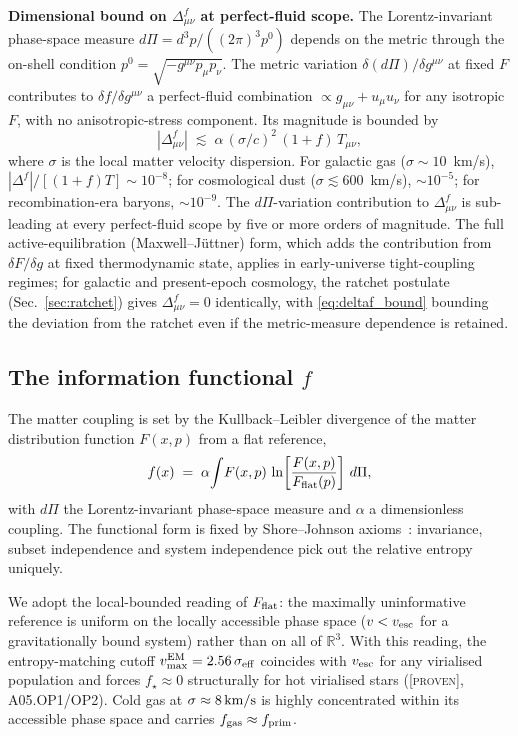 \documentclass[aps,prd,twocolumn,nofootinbib,floatfix,superscriptaddress]{revtex4-2}
\newcommand{\PROVEN}{{\color{black!75!green}\textsc{[proven]}}}
\newcommand{\fprim}{f_{\rm prim}}
\begin{document}
\textbf{Dimensional bound on $\Delta^f_{\mu\nu}$ at perfect-fluid scope.}
The Lorentz-invariant phase-space measure
$d\Pi = d^3p/((2\pi)^3 p^0)$ depends on the metric through the
on-shell condition $p^0 = \sqrt{-g^{\mu\nu}p_\mu p_\nu}$. The metric
variation $\delta(d\Pi)/\delta g^{\mu\nu}$ at fixed $F$ contributes
to $\delta f/\delta g^{\mu\nu}$ a perfect-fluid combination
$\propto g_{\mu\nu} + u_\mu u_\nu$ for any isotropic $F$, with no
anisotropic-stress component. Its magnitude is bounded by
\begin{equation}
\label{eq:deltaf_bound}
|\Delta^f_{\mu\nu}|\;\lesssim\;\alpha\,(\sigma/c)^2\,(1{+}f)\,T_{\mu\nu},
\end{equation}
where $\sigma$ is the local matter velocity dispersion. For galactic
gas ($\sigma\sim 10$~km/s), $|\Delta^f|/[(1{+}f)T]\sim 10^{-8}$; for
cosmological dust ($\sigma\lesssim 600$~km/s), $\sim 10^{-5}$; for
recombination-era baryons, $\sim 10^{-9}$. The $d\Pi$-variation
contribution to $\Delta^f_{\mu\nu}$ is sub-leading at every
perfect-fluid scope by five or more orders of magnitude. The full
active-equilibration (Maxwell--J\"uttner) form, which adds the
contribution from $\delta F/\delta g$ at fixed thermodynamic state,
applies in early-universe tight-coupling regimes; for galactic and
present-epoch cosmology, the ratchet postulate
(Sec.~\ref{sec:ratchet}) gives $\Delta^f_{\mu\nu} = 0$ identically,
with \eqref{eq:deltaf_bound} bounding the deviation from the
ratchet even if the metric-measure dependence is retained.

\subsection{The information functional $f$}
\label{sec:f}

The matter coupling is set by the Kullback--Leibler divergence of
the matter distribution function $F(x,p)$ from a flat reference,
\begin{equation}
\label{eq:f}
f(x) \;=\; \alpha\!\int\! F(x,p)\,
\ln\!\left[\frac{F(x,p)}{F_{\rm flat}(p)}\right]\,d\Pi,
\end{equation}
with $d\Pi$ the Lorentz-invariant phase-space measure and $\alpha$ a
dimensionless coupling. The functional form is fixed by
Shore--Johnson axioms~\cite{Shore1980,Aczel1966,Jaynes1957}: invariance, subset
independence and system independence pick out the relative entropy
uniquely.

We adopt the local-bounded reading of $F_{\rm flat}$: the maximally
uninformative reference is uniform on the locally accessible phase
space ($v < v_{\rm esc}$ for a gravitationally bound system) rather
than on all of $\mathbb{R}^3$. With this reading, the entropy-matching
cutoff $v_{\rm max}^{\rm EM}=2.56\,\sigma_{\rm eff}$ coincides with
$v_{\rm esc}$ for any virialised population and forces $f_\star\approx 0$
structurally for hot virialised stars (\PROVEN, A05.OP1/OP2). Cold
gas at $\sigma\approx 8\,{\rm km/s}$ is highly concentrated within
its accessible phase space and carries
$f_{\rm gas}\approx \fprim$.
\end{document}

